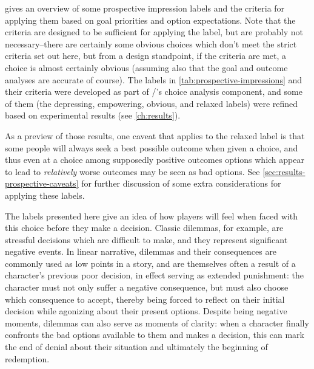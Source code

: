  gives an overview of some prospective impression labels and the criteria for applying them based on goal priorities and option expectations.
%
Note that the criteria are designed to be sufficient for applying the label, but are probably not necessary--there are certainly some obvious choices which don't meet the strict criteria set out here, but from a design standpoint, if the criteria are met, a choice is almost certainly obvious (assuming also that the goal and outcome analyses are accurate of course).
%
The labels in \cref{tab:prospective-impressions} and their criteria were developed as part of \dunyazad/'s choice analysis component, and some of them (the depressing, empowering, obvious, and relaxed labels) were refined based on experimental results (see \cref{ch:results}).


As a preview of those results, one caveat that applies to the relaxed label is that some people will always seek a best possible outcome when given a choice, and thus even at a choice among supposedly positive outcomes options which appear to lead to \emph{relatively} worse outcomes may be seen as bad options.
%
See \cref{sec:results-prospective-caveats} for further discussion of some extra considerations for applying these labels.


The labels presented here give an idea of how players will feel when faced with this choice before they make a decision.
%
Classic dilemmas, for example, are stressful decisions which are difficult to make, and they represent significant negative events.
%
In linear narrative, dilemmas and their consequences are commonly used as low points in a story, and are themselves often a result of a character's previous poor decision, in effect serving as extended punishment: the character must not only suffer a negative consequence, but must also choose which consequence to accept, thereby being forced to reflect on their initial decision while agonizing about their present options.
%
Despite being negative moments, dilemmas can also serve as moments of clarity: when a character finally confronts the bad options available to them and makes a decision, this can mark the end of denial about their situation and ultimately the beginning of redemption.


